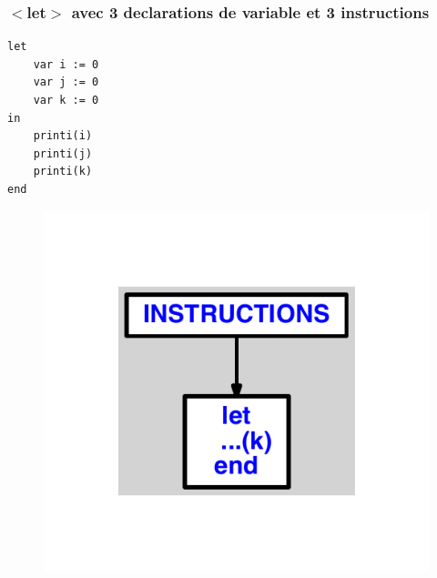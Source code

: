 \documentclass{article}
\begin{document}
\subsubsection{$ < $let$ > $ avec 3 declarations de variable et 3 instructions}
\begin{lstlisting}
let
	var i := 0
	var j := 0
	var k := 0
in
	printi(i)
	printi(j)
	printi(k)
end
\end{lstlisting}
\newpage
\begin{figure}[H]
\centering
\includegraphics[max width=\textwidth]{ast/ast_277.pdf}
\end{figure}
\newpage
\end{document}
